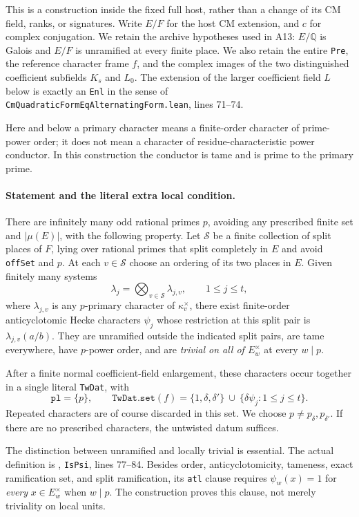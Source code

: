 \documentclass[11pt]{article}
\newcommand{\Q}{\mathbb Q}\newcommand{\C}{\mathbb C}\newcommand{\Z}{\mathbb Z}\newcommand{\R}{\mathbb R}\newcommand{\A}{\mathbb A}\newcommand{\OO}{\mathcal O}
\theoremstyle{definition}\newtheorem{definition}[theorem]{Definition}\newtheorem{remark}[theorem]{Remark}
\begin{document}
This is a construction inside the fixed full host, rather than a change
of its CM field, ranks, or signatures.  Write $E/F$ for the host CM
extension, and $c$ for complex conjugation.  We retain the archive
hypotheses used in A13: $E/\Q$ is Galois and $E/F$ is unramified at every
finite place.  We also retain the entire \texttt{Pre}, the reference
character frame $f$, and the complex images of the two distinguished
coefficient subfields $K_s$ and $L_0$.  The extension of the larger
coefficient field $L$ below is exactly an \texttt{Enl} in the sense of
\nolinkurl{CmQuadraticFormEqAlternatingForm.lean}, lines 71--74.

Here and below a primary character means a finite-order character of
prime-power order; it does not mean a character of residue-characteristic
power conductor.  In this construction the conductor is tame and is
prime to the primary prime.

\paragraph{Statement and the literal extra local condition.}
There are infinitely many odd rational primes $p$, avoiding any
prescribed finite set and $|\mu(E)|$, with the following property.
Let $\mathcal S$ be a finite collection of split places of $F$, lying
over rational primes that split completely in $E$ and avoid
\texttt{offSet} and $p$.  At each $v\in\mathcal S$ choose an ordering of
its two places in $E$.  Given finitely many systems
\[
 \lambda_j=\bigotimes_{v\in\mathcal S}\lambda_{j,v},
 \qquad 1\leq j\leq t,
 \tag{A14a}
\]
where $\lambda_{j,v}$ is any $p$-primary character of
$\kappa_v^\times$, there exist finite-order anticyclotomic Hecke
characters $\psi_j$ whose restriction at this split pair is
$\lambda_{j,v}(a/b)$.  They are unramified outside the indicated split
pairs, are tame everywhere, have $p$-power order, and are
\emph{trivial on all of $E_w^\times$} at every $w\mid p$.

After a finite normal coefficient-field enlargement, these characters
occur together in a single literal \texttt{TwDat}, with
\[
 \texttt{pl}=\{p\},\qquad
 \texttt{TwDat.set}(f)=
 \{1,\delta,\delta'\}\ \cup\ \{\delta\psi_j:1\leq j\leq t\}.
 \tag{A14b}
\]
Repeated characters are of course discarded in this set.  We choose
$p\ne p_{\delta},p_{\delta'}$.  If there are no prescribed characters,
the untwisted datum suffices.

The distinction between unramified and locally trivial is essential.
The actual definition is
,
\texttt{IsPsi}, lines 77--84.  Besides order, anticyclotomicity,
tameness, exact ramification set, and split ramification, its
\texttt{atl} clause requires $\psi_w(x)=1$ for \emph{every}
$x\in E_w^\times$ when $w\mid p$.  The construction proves this clause,
not merely triviality on local units.
\end{document}
